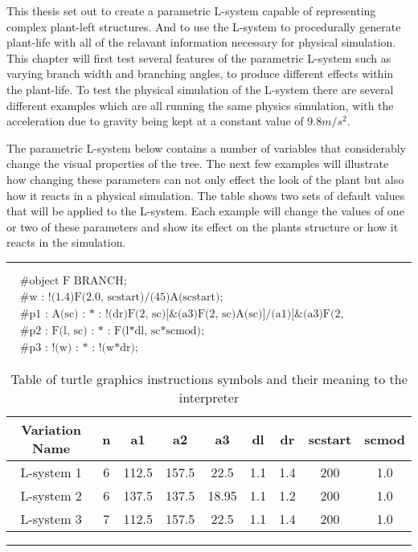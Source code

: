 This thesis set out to create a parametric L-system capable of representing complex plant-left structures. And to use the L-system to procedurally generate plant-life with all of the relavant information necessary for physical simulation. This chapter will first test several features of the parametric L-system such as varying branch width and branching angles, to produce different effects within the plant-life. To test the physical simulation of the L-system there are several different examples which are all running the same physics simulation, with the acceleration due to gravity being kept at a constant value of $9.8m/s^2$. 

The parametric L-system below contains a number of variables that considerably change the visual properties of the tree. The next few examples will illustrate how changing these parameters can not only effect the look of the plant but also how it reacts in a physical simulation. The table shows two sets of default values that will be applied to the L-system. Each example will change the values of one or two of these parameters and show its effect on the plants structure or how it reacts in the simulation.

\vspace{10mm}
\hrule
\begin{singlespace}
\begin{equation}
\begin{aligned}
	&\textrm{\#object F BRANCH;}\\
	&\textrm{\#w : !(1.4)F(2.0, scstart)/(45)A(scstart);}\\
	&\textrm{\#p1 : A(sc) : * : !(dr)F(2, sc)[\&(a3)F(2, sc)A(sc)]/(a1)[\&(a3)F(2, sc)A(sc)]/(a2)[\&(a3)F(2, sc)A(sc)];}\\
	&\textrm{\#p2 : F(l, sc) : * : F(l*dl, sc*scmod);}\\
	&\textrm{\#p3 : !(w) : * : !(w*dr);}
\end{aligned}
\end{equation}
\end{singlespace}

\begin{table}[h!]
\centering
\begin{tabular}{ | c | c | c | c | c | c | c | c | c | }
\hline
	Variation Name & n & a1 & a2 & a3 & dl & dr & scstart & scmod\\  
\hline
\hline
	L-system 1  & 6 & 112.5 & 157.5 & 22.5 & 1.1 & 1.4 & 200 & 1.0 \\
\hline
	L-system 2  & 6 & 137.5 & 137.5 & 18.95 & 1.1 & 1.2 & 200 & 1.0 \\
\hline
	L-system 3  & 7 & 112.5 & 157.5 & 22.5 & 1.1 & 1.4 & 200 & 1.0 \\
\hline
\end{tabular}
\caption{Table of turtle graphics instructions symbols and their meaning to the interpreter}
\label{DOL-system instructions}
\end{table}
\FloatBarrier
\hrule

